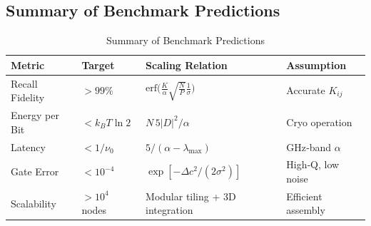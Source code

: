 \subsection{Summary of Benchmark Predictions}
\begin{table}[ht]
  \centering
  \caption{Summary of Benchmark Predictions}
  \label{tab:benchmarks}
  \begin{tabular}{@{}llll@{}}
    \toprule
    Metric               & Target        & Scaling Relation                             & Assumption \\
    \midrule
    Recall Fidelity      & $>99\%$       & $\mathrm{erf}\bigl(\frac{K}{\alpha}\sqrt{\frac{N}{P}}\frac1\sigma\bigr)$ & Accurate $K_{ij}$ \\
    Energy per Bit       & $<k_BT\ln2$   & $N\,5|D|^2/\alpha$                           & Cryo operation \\
    Latency              & $<1/\nu_0$    & $5/(\alpha-\lambda_{\max})$                  & GHz‐band $\alpha$ \\
    Gate Error           & $<10^{-4}$    & $\exp[-\Delta c^2/(2\sigma^2)]$              & High‐Q, low noise   \\
    Scalability          & $>10^4$ nodes & Modular tiling + 3D integration              & Efficient assembly  \\
    \bottomrule
  \end{tabular}
\end{table}

%